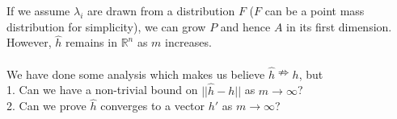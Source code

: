 \documentclass[a4paper]{article}
\begin{document}
 \noindent If we assume $\lambda_i$ are drawn from a distribution $F$ ($F$ can be a point mass distribution for simplicity), we can grow $P$ and hence $A$ in its first dimension. However, $\hat{h}$ remains in $\mathbb{R}^n$ as $m$ increases. \\  


\\
We have done some analysis which makes us believe $\hat{h} \nRightarrow h$, but \\
1. Can we have a non-trivial bound on $|| \hat{h}- h||$ as $m\rightarrow \infty$?\\
2. Can we prove $\hat{h}$ converges to a vector $h'$ as $m\rightarrow \infty$?\\
\end{document}
